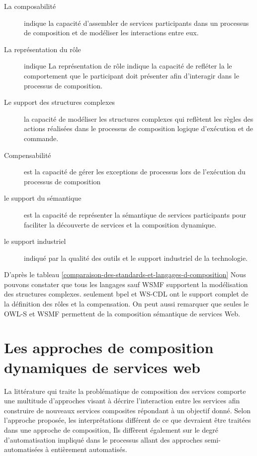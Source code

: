   \renewcommand{\descriptionlabel}[1]{\hspace{0.5cm}\textbullet~\textsf{#1}}
  \begin{description}
  \item [La composabilité] indique la capacité d'assembler de services
    participants dans un processus de composition et de modéliser les
    interactions entre eux.

  \item [La représentation du rôle] indique La représentation de rôle
    indique la capacité de refléter la le comportement que le
    participant doit présenter afin d'interagir dans le processus de
    composition.

  \item [Le support des structures complexes] la capacité de modéliser
    les structures complexes qui reflètent les règles des actions
    réalisées dans le processus de composition logique d'exécution et
    de commande.

  \item [Compensabilité] est la capacité de gérer les exceptions de
    processus lors de l'exécution du processus de composition

  \item [le support du sémantique] est la capacité de représenter la
    sémantique de services participants pour faciliter la découverte
    de services et la composition dynamique.

  \item [le support industriel] indiqué par la qualité des outils et
    le support industriel de la technologie.
  \end{description}
  \enddescription

  D'après le tableau
  \ref{comparaison-des-standards-et-langages-d-composition} Nous
  pouvons constater que tous les langages sauf \textsc{WSMF}
  supportent la modélisation des structures complexes. seulement
  \acrshort{bpel} et \textsc{WS-CDL} ont le support complet de la
  définition des rôles et la compensation. On peut aussi remarquer que
  seules le \textsc{OWL-S} et \textsc{WSMF} permettent de la
  composition sémantique de services Web.

  \section{Les approches de composition dynamiques de services web}
  \label{sec:comp-dynam}
  La littérature qui traite la problématique de composition des
  services comporte une multitude d'approches visant à décrire
  l'interaction entre les services afin construire de nouveaux
  services composites répondant à un objectif donné. Selon l'approche
  proposée, les interprétations différent de ce que devraient être
  traitées dans une approche de composition, Ils diffèrent également
  sur le degré d'automatisation impliqué dans le processus allant des
  approches semi-automatisées à entièrement automatisés.\medskip

